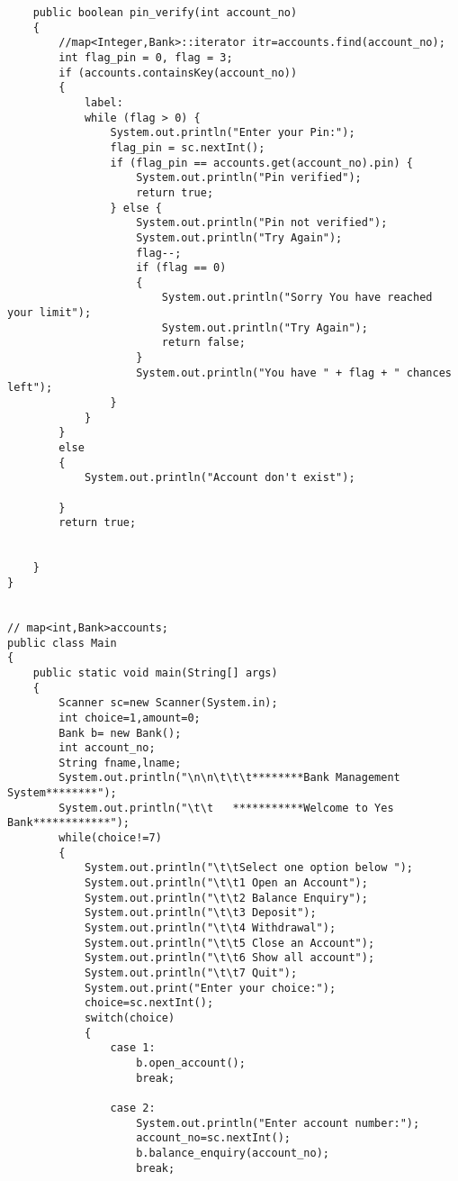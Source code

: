 \documentclass[11pt, a4paper]{article}
\begin{document}
\begin{lstlisting}
    public boolean pin_verify(int account_no)
    {
        //map<Integer,Bank>::iterator itr=accounts.find(account_no);
        int flag_pin = 0, flag = 3;
        if (accounts.containsKey(account_no))
        {
            label:
            while (flag > 0) {
                System.out.println("Enter your Pin:");
                flag_pin = sc.nextInt();
                if (flag_pin == accounts.get(account_no).pin) {
                    System.out.println("Pin verified");
                    return true;
                } else {
                    System.out.println("Pin not verified");
                    System.out.println("Try Again");
                    flag--;
                    if (flag == 0)
                    {
                        System.out.println("Sorry You have reached your limit");
                        System.out.println("Try Again");
                        return false;
                    }
                    System.out.println("You have " + flag + " chances left");
                }
            }
        }
        else
        {
            System.out.println("Account don't exist");

        }
        return true;


    }
}


// map<int,Bank>accounts;
public class Main
{
    public static void main(String[] args)
    {
        Scanner sc=new Scanner(System.in);
        int choice=1,amount=0;
        Bank b= new Bank();
        int account_no;
        String fname,lname;
        System.out.println("\n\n\t\t\t********Bank Management System********");
        System.out.println("\t\t   ***********Welcome to Yes Bank************");
        while(choice!=7)
        {
            System.out.println("\t\tSelect one option below ");
            System.out.println("\t\t1 Open an Account");
            System.out.println("\t\t2 Balance Enquiry");
            System.out.println("\t\t3 Deposit");
            System.out.println("\t\t4 Withdrawal");
            System.out.println("\t\t5 Close an Account");
            System.out.println("\t\t6 Show all account");
            System.out.println("\t\t7 Quit");
            System.out.print("Enter your choice:");
            choice=sc.nextInt();
            switch(choice)
            {
                case 1:
                    b.open_account();
                    break;

                case 2:
                    System.out.println("Enter account number:");
                    account_no=sc.nextInt();
                    b.balance_enquiry(account_no);
                    break;


\end{lstlisting}
\end{document}

